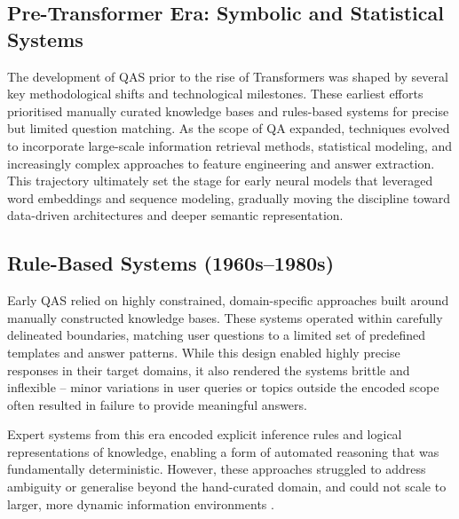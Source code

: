 \begin{spacing}{1.5}
\section{Pre-Transformer Era: Symbolic and Statistical Systems}
The development of QAS prior to the rise of Transformers was shaped by several key methodological shifts and technological milestones. These earliest efforts prioritised manually curated knowledge bases and rules-based systems for precise but limited question matching. As the scope of QA expanded, techniques evolved to incorporate large-scale information retrieval methods, statistical modeling, and increasingly complex approaches to feature engineering and answer extraction. This trajectory ultimately set the stage for early neural models that leveraged word embeddings and sequence modeling, gradually moving the discipline toward data-driven architectures and deeper semantic representation.

\subsection{Rule-Based Systems (1960s--1980s)}
Early QAS relied on highly constrained, domain-specific approaches built around manually constructed knowledge bases. These systems operated within carefully delineated boundaries, matching user questions to a limited set of predefined templates and answer patterns. While this design enabled highly precise responses in their target domains, it also rendered the systems brittle and inflexible -- minor variations in user queries or topics outside the encoded scope often resulted in failure to provide meaningful answers.

Expert systems from this era encoded explicit inference rules and logical representations of knowledge, enabling a form of automated reasoning that was fundamentally deterministic. However, these approaches struggled to address ambiguity or generalise beyond the hand-curated domain, and could not scale to larger, more dynamic information environments \citep{noauthor_question_2025, jurafsky_chapter_2024}.


\end{spacing}
